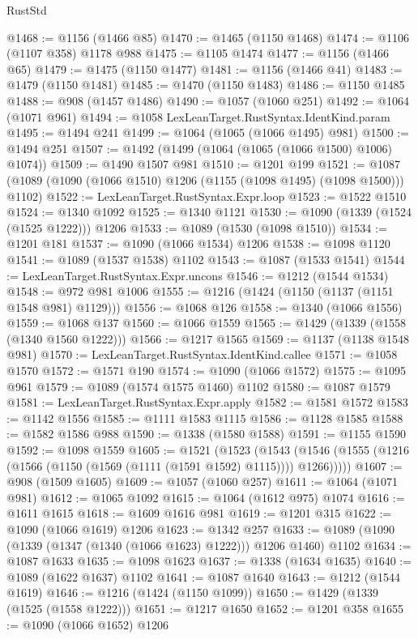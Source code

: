 \begin{lexlean}{RustStd}
\begin{coremodule}
@1468 := @1156 (@1466 @85)
@1470 := @1465 (@1150 @1468)
@1474 := @1106 (@1107 @358) @1178 @988
@1475 := @1105 @1474
@1477 := @1156 (@1466 @65)
@1479 := @1475 (@1150 @1477)
@1481 := @1156 (@1466 @41)
@1483 := @1479 (@1150 @1481)
@1485 := @1470 (@1150 @1483)
@1486 := @1150 @1485
@1488 := @908 (@1457 @1486)
@1490 := @1057 (@1060 @251)
@1492 := @1064 (@1071 @961)
@1494 := @1058 LexLeanTarget.RustSyntax.IdentKind.param
@1495 := @1494 @241
@1499 := @1064 (@1065 (@1066 @1495) @981)
@1500 := @1494 @251
@1507 := @1492 (@1499 (@1064 (@1065 (@1066 @1500) @1006) @1074))
@1509 := @1490 @1507 @981
@1510 := @1201 @199
@1521 := @1087 (@1089 (@1090 (@1066 @1510) @1206 (@1155 (@1098 @1495) (@1098 @1500))) @1102)
@1522 := LexLeanTarget.RustSyntax.Expr.loop
@1523 := @1522 @1510
@1524 := @1340 @1092
@1525 := @1340 @1121
@1530 := @1090 (@1339 (@1524 (@1525 @1222))) @1206
@1533 := @1089 (@1530 (@1098 @1510))
@1534 := @1201 @181
@1537 := @1090 (@1066 @1534) @1206
@1538 := @1098 @1120
@1541 := @1089 (@1537 @1538) @1102
@1543 := @1087 (@1533 @1541)
@1544 := LexLeanTarget.RustSyntax.Expr.uncons
@1546 := @1212 (@1544 @1534)
@1548 := @972 @981 @1006
@1555 := @1216 (@1424 (@1150 (@1137 (@1151 @1548 @981) @1129)))
@1556 := @1068 @126
@1558 := @1340 (@1066 @1556)
@1559 := @1068 @137
@1560 := @1066 @1559
@1565 := @1429 (@1339 (@1558 (@1340 @1560 @1222)))
@1566 := @1217 @1565
@1569 := @1137 (@1138 @1548 @981)
@1570 := LexLeanTarget.RustSyntax.IdentKind.callee
@1571 := @1058 @1570
@1572 := @1571 @190
@1574 := @1090 (@1066 @1572)
@1575 := @1095 @961
@1579 := @1089 (@1574 @1575 @1460) @1102
@1580 := @1087 @1579
@1581 := LexLeanTarget.RustSyntax.Expr.apply
@1582 := @1581 @1572
@1583 := @1142 @1556
@1585 := @1111 @1583 @1115
@1586 := @1128 @1585
@1588 := @1582 @1586 @988
@1590 := @1338 (@1580 @1588)
@1591 := @1155 @1590
@1592 := @1098 @1559
@1605 := @1521
    (@1523
      (@1543 (@1546 (@1555 (@1216 (@1566 (@1150 (@1569 (@1111 (@1591 @1592) @1115)))) @1266)))))
@1607 := @908 (@1509 @1605)
@1609 := @1057 (@1060 @257)
@1611 := @1064 (@1071 @981)
@1612 := @1065 @1092
@1615 := @1064 (@1612 @975) @1074
@1616 := @1611 @1615
@1618 := @1609 @1616 @981
@1619 := @1201 @315
@1622 := @1090 (@1066 @1619) @1206
@1623 := @1342 @257
@1633 := @1089 (@1090 (@1339 (@1347 (@1340 (@1066 @1623) @1222))) @1206 @1460) @1102
@1634 := @1087 @1633
@1635 := @1098 @1623
@1637 := @1338 (@1634 @1635)
@1640 := @1089 (@1622 @1637) @1102
@1641 := @1087 @1640
@1643 := @1212 (@1544 @1619)
@1646 := @1216 (@1424 (@1150 @1099))
@1650 := @1429 (@1339 (@1525 (@1558 @1222)))
@1651 := @1217 @1650
@1652 := @1201 @358
@1655 := @1090 (@1066 @1652) @1206

\end{coremodule}
\end{lexlean}
